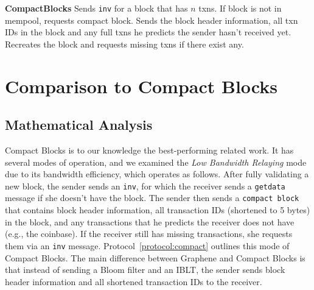 {\begin{myprot}{\textbf{CompactBlocks}}
\label{protocol:compact}
\STATE \sender Sends {\tt inv} for a block that has $n$ txns.
\STATE \recvr If block is not in mempool, requests compact block.
\STATE \sender Sends the block header information, all txn IDs in the block and any full txns he predicts the sender hasn't received yet.
\STATE \recvr Recreates the block and requests missing txns if there exist any.
\end{myprot}}

\section{Comparison to Compact Blocks} 
\subsection{Mathematical Analysis}
Compact Blocks\cite{Corallo:2016} is to our knowledge the best-performing related work. It has several modes of operation, and 
we examined the \textit{Low Bandwidth
  Relaying} mode due to its bandwidth efficiency, which operates as follows. 
After fully
validating a new block, the sender sends an {\tt inv}, for which the receiver sends a {\tt getdata} message if she
doesn't have the block. The sender then sends a {\tt compact block}
that contains block header information, all  transaction IDs (shortened to 5 bytes)
in the block, and any transactions that he predicts the receiver does
not have (e.g., the coinbase). If the receiver still has missing transactions, she requests
them via an {\tt inv} message. Protocol~\ref{protocol:compact} outlines
this  mode of Compact Blocks. The main difference between Graphene and Compact Blocks is that instead of
sending a Bloom filter and an IBLT, the sender sends block header
information and all shortened transaction IDs to the receiver. 

